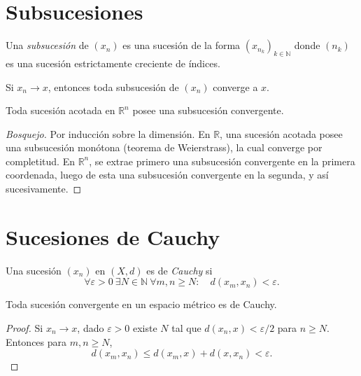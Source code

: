\section{Subsucesiones}

\begin{definition}
\label{def:subsucesion}
Una \emph{subsucesión} de $(x_n)$ es una sucesión de la forma $(x_{n_k})_{k\in\mathbb{N}}$ donde $(n_k)$ es una sucesión estrictamente creciente de índices.
\end{definition}

\begin{proposition}
\label{prop:limite-subsucesion}
Si $x_n\to x$, entonces toda subsucesión de $(x_n)$ converge a $x$.
\end{proposition}

\begin{theorem}
\label{teo:bw-rn}
Toda sucesión acotada en $\mathbb{R}^n$ posee una subsucesión convergente.
\end{theorem}
\begin{proof}[Bosquejo]
Por inducción sobre la dimensión. En $\mathbb{R}$, una sucesión acotada posee una subsucesión monótona (teorema de Weierstrass), la cual converge por completitud. En $\mathbb{R}^n$, se extrae primero una subsucesión convergente en la primera coordenada, luego de esta una subsucesión convergente en la segunda, y así sucesivamente.
\end{proof}

\section{Sucesiones de Cauchy}

\begin{definition}
\label{def:cauchy}
Una sucesión $(x_n)$ en $(X,d)$ es de \emph{Cauchy} si
\begin{equation}\label{eq:cauchy}
  \forall\varepsilon>0\ \exists N\in\mathbb{N}\ \forall m,n\geq N:\quad d(x_m,x_n)<\varepsilon.
\end{equation}
\end{definition}

\begin{proposition}
\label{prop:convergente-cauchy}
Toda sucesión convergente en un espacio métrico es de Cauchy.
\end{proposition}
\begin{proof}
Si $x_n\to x$, dado $\varepsilon>0$ existe $N$ tal que $d(x_n,x)<\varepsilon/2$ para $n\geq N$. Entonces para $m,n\geq N$,
\[
  d(x_m,x_n)\leq d(x_m,x)+d(x,x_n)<\varepsilon.
\]
\end{proof}


